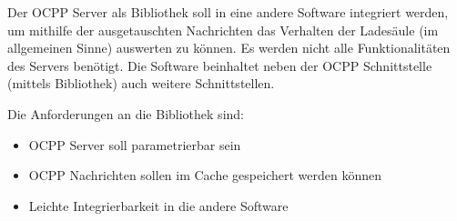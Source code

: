 
Der OCPP Server als Bibliothek soll in eine andere Software integriert werden, 
um mithilfe der ausgetauschten Nachrichten das Verhalten der Ladesäule (im allgemeinen Sinne) auswerten zu können.
Es werden nicht alle Funktionalitäten des Servers benötigt. 
Die Software beinhaltet neben der OCPP Schnittstelle (mittels Bibliothek) auch weitere Schnittstellen.



Die Anforderungen an die Bibliothek sind:
\begin{itemize}
    \item OCPP Server soll parametrierbar sein
    \item OCPP Nachrichten sollen im Cache gespeichert werden können
    \item Leichte Integrierbarkeit in die andere Software
\end{itemize}

